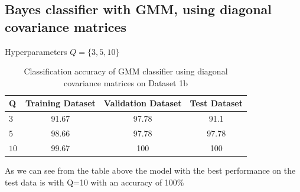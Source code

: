 \documentclass[11pt]{article}
\begin{document}
\newpage
\subsection{Bayes classifier with GMM, using diagonal covariance matrices}
Hyperparameters $Q = \{3,5,10\}$
\begin{table}[h!]
\label{tab:tab1.1.1}
\begin{center}
\begin{tabular}{|l|c|c|c|}
\hline
\textbf{Q } & \textbf{Training Dataset} & \textbf{Validation Dataset} &\textbf{Test Dataset}\\
\hline
$3$ & 91.67 & 97.78 & 91.1\\
\hline
$5$ & 98.66 & 97.78 & 97.78\\
\hline
$10$ & 99.67 & 100 & 100\\
\hline
\end{tabular}
\caption{Classification accuracy of GMM classifier using diagonal covariance matrices on Dataset 1b}
\end{center}
\end{table}

As we can see from the table above the model with the best performance on the test data is with  Q=10 with an accuracy of 100\% 
\end{document}
